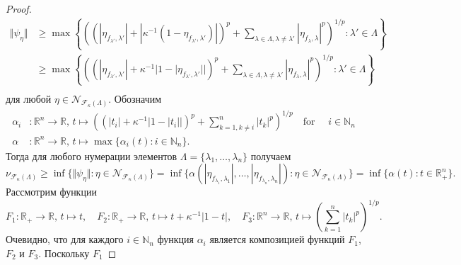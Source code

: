 \documentclass[12pt]{article}
\begin{document}
\begin{proof}
    \[
    \begin{aligned}
        \Vert \psi_{\eta}\Vert
        &\geq\max\left\{
            \left(
                (
                    |\eta_{f_{\lambda'},\lambda'}|+
                    |\kappa^{-1}(1-\eta_{f_{\lambda'},\lambda'})|
                )^p
                +
                \sum_{\lambda\in\Lambda,\lambda\neq \lambda'}
                    |\eta_{f_\lambda,\lambda}|^p
            \right)^{1/p}:
            \lambda'\in\Lambda
        \right\} \\
        &\geq\max\left\{
            \left(
                (
                    |\eta_{f_{\lambda'},\lambda'}|+
                    \kappa^{-1}|1-|\eta_{f_{\lambda'},\lambda'}||
                )^p
                +
                \sum_{\lambda\in\Lambda,\lambda\neq \lambda'} 
                    |\eta_{f_\lambda,\lambda}|^p
            \right)^{1/p}:
            \lambda'\in\Lambda
        \right\} \\
    \end{aligned}
    \]
    для любой $\eta\in\mathcal{N}_{\mathcal{F}_{\kappa}(\Lambda)}$. Обозначим
    \[
    \begin{aligned}
        \alpha_i&:\mathbb{R}^n\to\mathbb{R},\,
        t\mapsto \left(
            (|t_i|+\kappa^{-1}|1-|t_i||)^p+\sum_{k=1,k\neq i}^n |t_k|^p
        \right)^{1/p} \quad\text{for }\quad i\in\mathbb{N}_n \\
        \alpha&:\mathbb{R}^n\to\mathbb{R},\,
        t\mapsto\max\{\alpha_i(t):i\in\mathbb{N}_n\}.
    \end{aligned}
    \]
    Тогда для любого нумерации 
    элементов $\Lambda=\{\lambda_1,\ldots,\lambda_n\}$ получаем
    \[
        \nu_{\mathcal{F}_{\kappa}(\Lambda)}
        \geq\inf\{
            \Vert \psi_{\eta}\Vert : 
            \eta\in\mathcal{N}_{\mathcal{F}_{\kappa}(\Lambda)}
        \}
        =\inf\{
            \alpha(
                |\eta_{f_{\lambda_1},\lambda_1}|,
                \ldots,
                |\eta_{f_{\lambda_n},\lambda_n}|
            ) : 
            \eta\in\mathcal{N}_{\mathcal{F}_{\kappa}(\Lambda)}
        \}
        =\inf\{\alpha(t) : t\in\mathbb{R}_+^n\}.
    \]
    Рассмотрим функции
    \[
        F_1:\mathbb{R}_+\to\mathbb{R},\, 
            t\mapsto t, \quad
        F_2:\mathbb{R}_+\to\mathbb{R},\, 
            t\mapsto t+\kappa^{-1}|1-t|, \quad
        F_3:\mathbb{R}^n\to\mathbb{R},\, t\mapsto 
            \left(\sum_{k=1}^n|t_k|^p\right)^{1/p}.
    \]
    Очевидно, что для каждого $i\in\mathbb{N}_n$ функция $\alpha_i$ является 
    композицией функций $F_1$, $F_2$ и $F_3$. Поскольку $F_1$ 

\end{proof}
\end{document}
